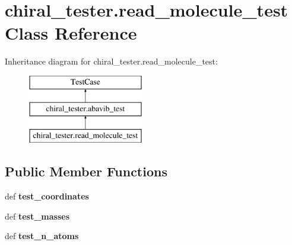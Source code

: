 \hypertarget{classchiral__tester_1_1read__molecule__test}{\section{chiral\+\_\+tester.\+read\+\_\+molecule\+\_\+test Class Reference}
\label{classchiral__tester_1_1read__molecule__test}
}
Inheritance diagram for chiral\+\_\+tester.\+read\+\_\+molecule\+\_\+test\+:\begin{figure}[H]
\begin{center}
\leavevmode
\includegraphics[height=3.000000cm]{classchiral__tester_1_1read__molecule__test}
\end{center}
\end{figure}
\subsection*{Public Member Functions}
\begin{DoxyCompactItemize}
\item 
\hypertarget{classchiral__tester_1_1read__molecule__test_ac881ffd684209c4d1bab8136b74261ed}{def {\bfseries test\+\_\+coordinates}}\label{classchiral__tester_1_1read__molecule__test_ac881ffd684209c4d1bab8136b74261ed}

\item 
\hypertarget{classchiral__tester_1_1read__molecule__test_a6b02e84c4165ca4faaa14bcdca6e2641}{def {\bfseries test\+\_\+masses}}\label{classchiral__tester_1_1read__molecule__test_a6b02e84c4165ca4faaa14bcdca6e2641}

\item 
\hypertarget{classchiral__tester_1_1read__molecule__test_ab4e464a0bb098ca742ff7036a80d1727}{def {\bfseries test\+\_\+n\+\_\+atoms}}\label{classchiral__tester_1_1read__molecule__test_ab4e464a0bb098ca742ff7036a80d1727}

\end{DoxyCompactItemize}
